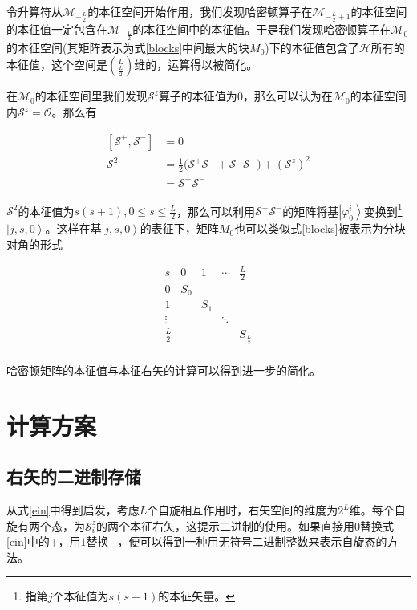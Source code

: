 \documentclass[UTF8,12pt]{article}
\providecommand\Ket[1]{\left|\right. #1 \left.\right\rangle}
\numberwithin{equation}{subsection}
\begin{document}
	令升算符从$\mathcal M_{-\frac{L}{2}}$的本征空间开始作用，我们发现哈密顿算子在$\mathcal M_{-\frac{L}{2}+1}$的本征空间的本征值一定包含在$\mathcal M_{-\frac{L}{2}}$的本征空间中的本征值。于是我们发现哈密顿算子在$\mathcal M_0$的本征空间(其矩阵表示为式\ref{blocks}中间最大的块$M_0$)下的本征值包含了$\mathcal H$所有的本征值，这个空间是$\binom{L}{\frac{L}{2}}$维的，运算得以被简化。
	
	在$\mathcal M_0$的本征空间里我们发现$\mathcal S^z$算子的本征值为$0$，那么可以认为在$\mathcal M_0$的本征空间内$\mathcal S^z = \mathcal O$。那么有
	\begin{snugshade}
		\begin{equation}
			\begin{aligned}
				\left[\mathcal S^+,\mathcal S^-\right]&=0\\
				\mathcal S^2 &= \frac{1}{2}\Big(\mathcal S^+\mathcal S^-+\mathcal S^-\mathcal S^+\Big)+(\mathcal S^z)^2\\
				&=\mathcal S^+\mathcal S^-
			\end{aligned}
			\label{M0Ssqaure}
		\end{equation}
	\end{snugshade}
	
	$\mathcal S^2$的本征值为$s(s+1),0\leq s \leq \frac{L}{2}$，那么可以利用$\mathcal S^+\mathcal S^-$的矩阵将基$\Ket{\varphi^i_0}$变换到\footnote{指第$j$个本征值为$s(s+1)$的本征矢量。}$\Ket{j,s,0}$。这样在基$\Ket{j,s,0}$的表征下，矩阵$M_0$也可以类似式\ref{blocks}被表示为分块对角的形式
	\begin{snugshade}
		\begin{equation}
			\begin{array}{c|c|c|c|c}
				s&0&1&\cdots&\frac{L}{2}\\
				\hline
				0&S_{0}&&&\\
				\hline
				1&&S_{1}&&\\
				\hline
				\vdots&&&\ddots&\\
				\hline
				\frac{L}{2}&&&&S_{\frac{L}{2}}\\
			\end{array}
			\label{blocksM0}
		\end{equation}
	\end{snugshade}

	哈密顿矩阵的本征值与本征右矢的计算可以得到进一步的简化。
	\clearpage
	\section{计算方案}
	\subsection{右矢的二进制存储}
	从式\ref{ein}中得到启发，考虑$L$个自旋相互作用时，右矢空间的维度为$2^L$维。每个自旋有两个态，为$\mathcal S^z_i$的两个本征右矢，这提示二进制的使用。如果直接用$0$替换式\ref{ein}中的$+$，用$1$替换$-$，便可以得到一种用无符号二进制整数来表示自旋态的方法。
	
\end{document}
